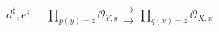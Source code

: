 \(
d^\natural,e^\natural:\quad
\prod_{p(y)=z}\mathcal O_{Y,y}
\mathrel{\substack{\longrightarrow\\[-.65ex]\longrightarrow}}
\prod_{q(x)=z}\mathcal O_{X,x}
\)
